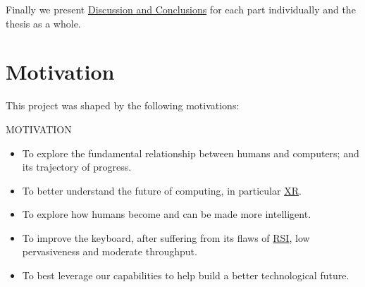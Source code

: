 \documentclass[logo,bsc,singlespacing,parskip]{infthesis}
\begin{document}
Finally we present \hyperref[sec:org68cb77f]{Discussion and Conclusions} for each part individually and the thesis as a whole.

\chapter*{Motivation}
\label{sec:org9603ff4}

This project was shaped by the following motivations:

\begin{mdframed}
\begin{description}
\item[{MOTIVATION}] 
\end{description}


\begin{itemize}
\item To explore the fundamental relationship between humans and computers; and its trajectory of progress.

\item To better understand the future of computing, in particular \hyperref[org39cbd51]{XR}.

\item To explore how humans become and can be made more intelligent.

\item To improve the keyboard, after suffering from its flaws of \hyperref[org77f0234]{RSI}, low pervasiveness and moderate throughput.

\item To best leverage our capabilities to help build a better technological future.
\end{itemize}
\end{mdframed}
\end{document}
